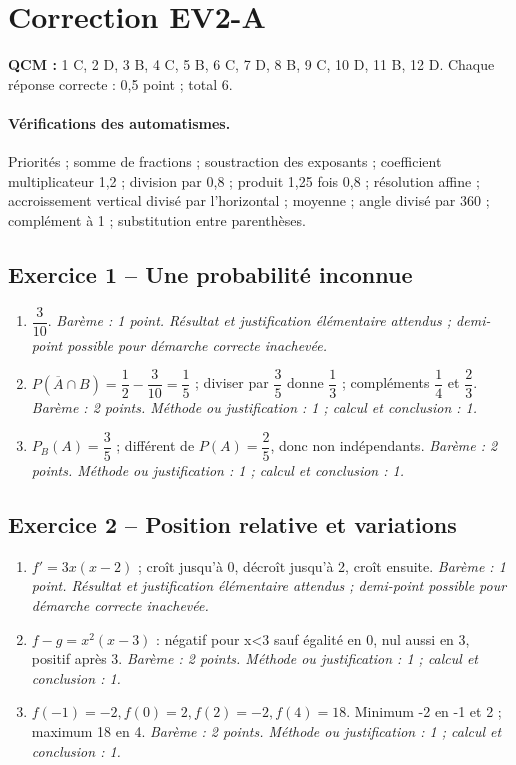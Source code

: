 \clearpage\section*{Correction EV2-A}\label{EV2-A-CORR}
\textbf{QCM :} 1 C, 2 D, 3 B, 4 C, 5 B, 6 C, 7 D, 8 B, 9 C, 10 D, 11 B, 12 D. Chaque réponse correcte : 0,5 point ; total 6.
\paragraph{Vérifications des automatismes.} Priorités ; somme de fractions ; soustraction des exposants ; coefficient multiplicateur 1,2 ; division par 0,8 ; produit 1,25 fois 0,8 ; résolution affine ; accroissement vertical divisé par l’horizontal ; moyenne ; angle divisé par 360 ; complément à 1 ; substitution entre parenthèses.
\subsection*{Exercice 1 -- Une probabilité inconnue}
\begin{enumerate}
\item $\dfrac{3}{10}$. \textit{Barème : 1 point. Résultat et justification élémentaire attendus ; demi-point possible pour démarche correcte inachevée.}
\item $P(\overline A\cap B)=\dfrac{1}{2}-\dfrac{3}{10}=\dfrac{1}{5}$ ; diviser par $\dfrac{3}{5}$ donne $\dfrac{1}{3}$ ; compléments $\dfrac{1}{4}$ et $\dfrac{2}{3}$. \textit{Barème : 2 points. Méthode ou justification : 1 ; calcul et conclusion : 1.}
\item $P_B(A)=\dfrac{3}{5}$ ; différent de $P(A)=\dfrac{2}{5}$, donc non indépendants. \textit{Barème : 2 points. Méthode ou justification : 1 ; calcul et conclusion : 1.}
\end{enumerate}
\subsection*{Exercice 2 -- Position relative et variations}
\begin{enumerate}
\item $f\prime=3x(x-2)$ ; croît jusqu’à 0, décroît jusqu’à 2, croît ensuite. \textit{Barème : 1 point. Résultat et justification élémentaire attendus ; demi-point possible pour démarche correcte inachevée.}
\item $f-g=x^2(x-3)$ : négatif pour x<3 sauf égalité en 0, nul aussi en 3, positif après 3. \textit{Barème : 2 points. Méthode ou justification : 1 ; calcul et conclusion : 1.}
\item $f(-1)=-2,f(0)=2,f(2)=-2,f(4)=18$. Minimum -2 en -1 et 2 ; maximum 18 en 4. \textit{Barème : 2 points. Méthode ou justification : 1 ; calcul et conclusion : 1.}
\end{enumerate}
